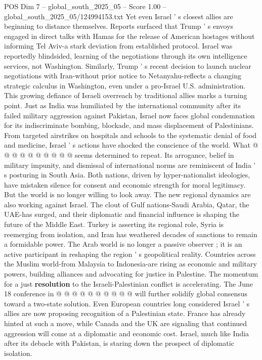 \begin{textsample}{POS Dim 7 – global\_south\_2025\_05 – Score 1.00 – global\_south\_2025\_05/124994153.txt}
Yet even Israel ' s closest allies are beginning to distance themselves.
Reports surfaced that Trump ' s envoys engaged in direct talks with Hamas for the release of American hostages without informing Tel Aviv-a stark deviation from established protocol.
Israel was reportedly blindsided, learning of the negotiations through its own intelligence services, not Washington.
Similarly, Trump ' s recent decision to launch nuclear negotiations with Iran-without prior notice to Netanyahu-reflects a changing strategic calculus in Washington, even under a pro-Israel U.S. administration.
This growing defiance of Israeli overreach by traditional allies marks a turning point.
Just as India was humiliated by the international community after its failed military aggression against Pakistan, Israel now faces global condemnation for its indiscriminate bombing, blockade, and mass displacement of Palestinians.
From targeted airstrikes on hospitals and schools to the systematic denial of food and medicine, Israel ' s actions have shocked the conscience of the world.
What @ @ @ @ @ @ @ @ @ @ seems determined to repeat.
Its arrogance, belief in military impunity, and dismissal of international norms are reminiscent of India ' s posturing in South Asia.
Both nations, driven by hyper-nationalist ideologies, have mistaken silence for consent and economic strength for moral legitimacy.
But the world is no longer willing to look away.
The new regional dynamics are also working against Israel.
The clout of Gulf nations-Saudi Arabia, Qatar, the UAE-has surged, and their diplomatic and financial influence is shaping the future of the Middle East.
Turkey is asserting its regional role, Syria is reemerging from isolation, and Iran has weathered decades of sanctions to remain a formidable power.
The Arab world is no longer a passive observer ; it is an active participant in reshaping the region ' s geopolitical reality.
Countries across the Muslim world-from Malaysia to Indonesia-are rising as economic and military powers, building alliances and advocating for justice in Palestine.
The momentum for a just \textbf{resolution} to the Israeli-Palestinian conflict is accelerating.
The June 18 conference in @ @ @ @ @ @ @ @ @ @ will further solidify global consensus toward a two-state solution.
Even European countries long considered Israel ' s allies are now proposing recognition of a Palestinian state.
France has already hinted at such a move, while Canada and the UK are signaling that continued aggression will come at a diplomatic and economic cost.
Israel, much like India after its debacle with Pakistan, is staring down the prospect of diplomatic isolation.

\end{textsample}
